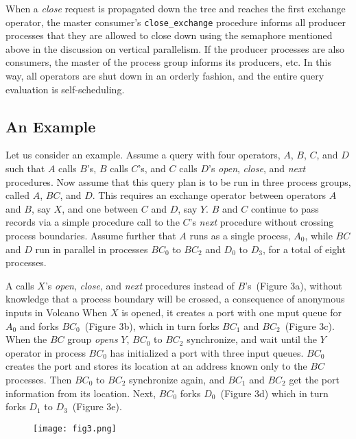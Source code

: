 \documentclass[a4paper,11pt,notitlepage,twoside,openright]{article}
\begin{document}
When a \emph{close} request is propagated down the tree
and reaches the first exchange operator, the master
consumer's \texttt{close\_exchange} procedure informs all producer
processes that they are allowed to close down using the
semaphore mentioned above in the discussion on vertical
parallelism. If the producer processes are also consumers,
the master of the process group informs its producers, etc.
In this way, all operators are shut down in an orderly
fashion, and the entire query evaluation is self-scheduling.

\subsection{An Example}

Let us consider an example. Assume a query with
four operators, \(A\), \(B\), \(C\), and \(D\) such that \(A\) calls \(B\)'s, \(B\)
calls \(C\)'s, and \(C\) calls \(D\)'s \emph{open}, \emph{close}, and \emph{next} procedures.
Now assume that this query plan is to be run in
three process groups, called \(A\), \(BC\), and \(D\). This requires
an exchange operator between operators \(A\) and \(B\), say \(X\),
and one between \(C\) and \(D\), say \(Y\). \(B\) and \(C\) continue to
pass records via a simple procedure call to the \(C\)'s \emph{next}
procedure without crossing process boundaries. Assume
further that \(A\) runs as a single process, \(A_0\), while \(BC\) and
\(D\) run in parallel in processes \(BC_0\) to \(BC_2\) and \(D_0\) to \(D_3\),
for a total of eight processes.

A calls $X$'s \emph{open}, \emph{close}, and \emph{next} procedures instead
of $B$'s~(Figure 3a), without knowledge that a process boundary
will be crossed, a consequence of anonymous inputs in
Volcano When $X$ is opened, it creates a port with one
mput queue for $A_0$ and forks $BC_0$~(Figure 3b), which in
turn forks $BC_1$ and $BC_2$~(Figure 3c). When the $BC$ group
\emph{opens} $Y$, $BC_0$ to $BC_2$ synchronize, and wait until the $Y$
operator in process $BC_0$ has initialized a port with three
input queues. $BC_0$ creates the port and stores its location
at an address known only to the $BC$ processes. Then $BC_0$
to $BC_2$ synchronize again, and $BC_1$ and $BC_2$ get the port
information from its location. Next, $BC_0$ forks $D_0$~(Figure 3d)
which in turn forks $D_1$ to $D_3$~(Figure 3e).

\begin{figure}
  \centering
  \texttt{[image: fig3.png]}
\end{figure}
\end{document}
